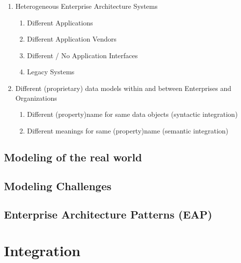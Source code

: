 \documentclass[
     12pt,         %
     a4paper,      %
     BCOR10mm,     %
     DIV14,        %
aragraph skip instad of paragraph indent
     ]{scrreprt}
\begin{document}
\begin{enumerate}
     \item Heterogeneous Enterprise Architecture Systems
           \begin{enumerate}
                \item Different Applications
                \item Different Application Vendors
                \item Different / No Application Interfaces
                \item Legacy Systems
           \end{enumerate}
     \item Different (proprietary) data models within and between Enterprises and Organizations
           \begin{enumerate}
                \item Different (property)name for same data objects (syntactic integration)
                \item Different meanings for same (property)name (semantic integration)
           \end{enumerate}
\end{enumerate}

\subsection{Modeling of the real world}

\subsection{Modeling Challenges}

\subsection{Enterprise Architecture Patterns (EAP)}


\section{Integration}

\end{document}
